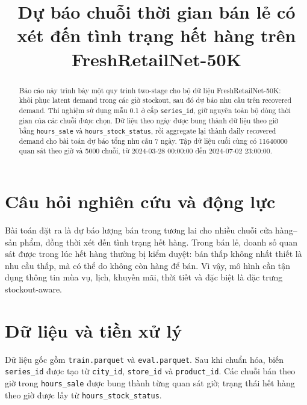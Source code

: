 \documentclass[12pt,a4paper]{article}
\title{Dự báo chuỗi thời gian bán lẻ có xét đến tình trạng hết hàng trên FreshRetailNet-50K}
\author{}
\date{}
\begin{document}
\maketitle

\begin{abstract}
Báo cáo này trình bày một quy trình two-stage cho bộ dữ liệu FreshRetailNet-50K: khôi phục latent demand trong các giờ stockout, sau đó dự báo nhu cầu trên recovered demand.
Thí nghiệm sử dụng mẫu 0.1 ở cấp \texttt{series\_id}, giữ nguyên toàn bộ dòng thời gian của các chuỗi được chọn.
Dữ liệu theo ngày được bung thành dữ liệu theo giờ bằng \texttt{hours\_sale} và \texttt{hours\_stock\_status}, rồi aggregate lại thành daily recovered demand cho bài toán dự báo tổng nhu cầu 7 ngày.
Tập dữ liệu cuối cùng có 11640000 quan sát theo giờ và 5000 chuỗi, từ 2024-03-28 00:00:00 đến 2024-07-02 23:00:00.
\end{abstract}

\section{Câu hỏi nghiên cứu và động lực}
Bài toán đặt ra là dự báo lượng bán trong tương lai cho nhiều chuỗi cửa hàng--sản phẩm, đồng thời xét đến tình trạng hết hàng.
Trong bán lẻ, doanh số quan sát được trong lúc hết hàng thường bị kiểm duyệt: bán thấp không nhất thiết là nhu cầu thấp, mà có thể do không còn hàng để bán.
Vì vậy, mô hình cần tận dụng thông tin mùa vụ, lịch, khuyến mãi, thời tiết và đặc biệt là đặc trưng stockout-aware.

\section{Dữ liệu và tiền xử lý}
Dữ liệu gốc gồm \texttt{train.parquet} và \texttt{eval.parquet}.
Sau khi chuẩn hóa, biến \texttt{series\_id} được tạo từ \texttt{city\_id}, \texttt{store\_id} và \texttt{product\_id}.
Các chuỗi bán theo giờ trong \texttt{hours\_sale} được bung thành từng quan sát giờ; trạng thái hết hàng theo giờ được lấy từ \texttt{hours\_stock\_status}.
\end{document}
